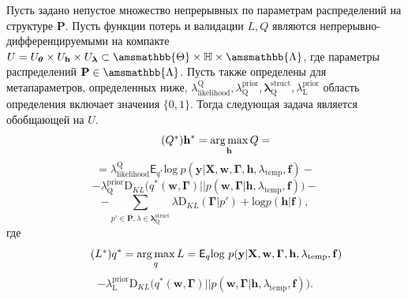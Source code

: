 \begin{theorem}
Пусть задано непустое множество непрерывных по параметрам распределений на структуре $\mathbf{P}$. 
Пусть функции потерь и валидации $L,Q$ являются непрерывно-дифференцируемыми на компакте  $U = U_{\boldsymbol{\theta}} \times U_{\mathbf{h}} \times U_{\boldsymbol{\lambda}} \subset \amsmathbb{\Theta} \times \mathbb{H} \times \amsmathbb{\Lambda}$, где параметры распределений $\mathbf{P} \in \amsmathbb{\Lambda}$. Пусть также определены для метапараметров, определенных ниже, $\lambda_\text{likelihood}^\text{Q}, \lambda^\text{prior}_\text{Q}, \boldsymbol{\lambda}^\text{struct}_\text{Q}, \lambda^\text{prior}_\text{L}$ область определения включает значения $\{0,1\}$.   
Тогда следующая задача является обобщающей на $U$.
\begin{equation}
\tag{$Q^{*}$}
\label{eq:qopt}
\mathbf{h}^{*} = \argmax_{\mathbf{h}} Q = 
\end{equation}
\[
= {\lambda_\text{likelihood}^\text{Q}\mathsf{E}_{{q}^{*}} \text{log}~{p(\mathbf{y} | \mathbf{X}, \mathbf{w},\boldsymbol{\Gamma}, \mathbf{h}, \lambda_\text{temp}, \mathbf{f})}}
 -\]
\vspace{-0.3cm}
\[- {\lambda^\text{prior}_\text{Q}\text{D}_{KL}\bigl( q^{*}(\mathbf{w}, \boldsymbol{\Gamma}) || p(\mathbf{w}, \boldsymbol{\Gamma} |\mathbf{h}, \lambda_{\text{temp}},\mathbf{f}) \bigr)}  -\]
\vspace{-0.3cm}
\[
-{\sum_{p' \in \mathbf{P}, \lambda \in \boldsymbol{\lambda}^\text{struct}_\text{Q}} \lambda\text{D}_{KL}(\boldsymbol{\Gamma} | p')+\text{log}p(\mathbf{h}|\mathbf{f})}, 
\]
где 
\begin{equation}
\tag{$L^{*}$}
{q}^{*} = \argmax_{q} L = 
{\mathsf{E}_q \text{log}~{p(\mathbf{y} | \mathbf{X}, \mathbf{w}, \boldsymbol{\Gamma}, \mathbf{h}, \lambda_{\text{temp}}, \mathbf{f})}}
\end{equation}
\vspace{-0.3cm}
\[- {\lambda^\text{prior}_\text{L}\text{D}_{KL}\bigl( q^{*}(\mathbf{w}, \boldsymbol{\Gamma}) || p(\mathbf{w}, \boldsymbol{\Gamma} |\mathbf{h}, \lambda_{\text{temp}},\mathbf{f}) \bigr)}.
\]
\end{theorem}
